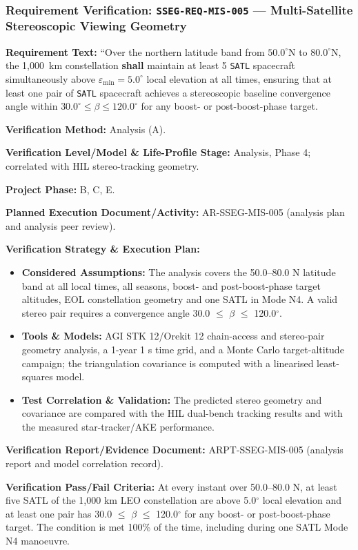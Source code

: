 \subsubsection{Requirement Verification: \texttt{SSEG-REQ-MIS-005} --- Multi-Satellite Stereoscopic Viewing Geometry}
\label{ver:SSEG-REQ-MIS-005}
\textbf{Requirement Text:} ``Over the northern latitude band from $50.0^\circ\text{N}$ to $80.0^\circ\text{N}$, the 1,000~km  constellation \textbf{shall} maintain at least 5 \texttt{SATL} spacecraft simultaneously above $\varepsilon_{\min} = 5.0^\circ$ local elevation at all times, ensuring that at least one pair of \texttt{SATL} spacecraft achieves a stereoscopic baseline convergence angle within $30.0^\circ \le \beta \le 120.0^\circ$ for any boost- or post-boost-phase target.
\par\textbf{Verification Method:} Analysis (A).
\par\textbf{Verification Level/Model \& Life-Profile Stage:} Analysis, Phase 4; correlated with HIL stereo-tracking geometry.
\par\textbf{Project Phase:} B, C, E.
\par\textbf{Planned Execution Document/Activity:} AR-SSEG-MIS-005 (analysis plan and analysis peer review).
\par\textbf{Verification Strategy \& Execution Plan:}
\begin{itemize}
\item \textbf{Considered Assumptions:} The analysis covers the 50.0--80.0 N latitude band at all local times, all seasons, boost- and post-boost-phase target altitudes, EOL constellation geometry and one SATL in Mode N4. A valid stereo pair requires a convergence angle 30.0 $\le$ $\beta$ $\le$ 120.0$^\circ$.
\item \textbf{Tools \& Models:} AGI STK 12/Orekit 12 chain-access and stereo-pair geometry analysis, a 1-year 1 s time grid, and a Monte Carlo target-altitude campaign; the triangulation covariance is computed with a linearised least-squares model.
\item \textbf{Test Correlation \& Validation:} The predicted stereo geometry and covariance are compared with the HIL dual-bench tracking results and with the measured star-tracker/AKE performance.
\end{itemize}
\par\textbf{Verification Report/Evidence Document:} ARPT-SSEG-MIS-005 (analysis report and model correlation record).
\par\textbf{Verification Pass/Fail Criteria:} At every instant over 50.0--80.0 N, at least five SATL of the 1,000 km LEO constellation are above 5.0$^\circ$ local elevation and at least one pair has 30.0 $\le$ $\beta$ $\le$ 120.0$^\circ$ for any boost- or post-boost-phase target. The condition is met 100\% of the time, including during one SATL Mode N4 manoeuvre.
\par\medskip
